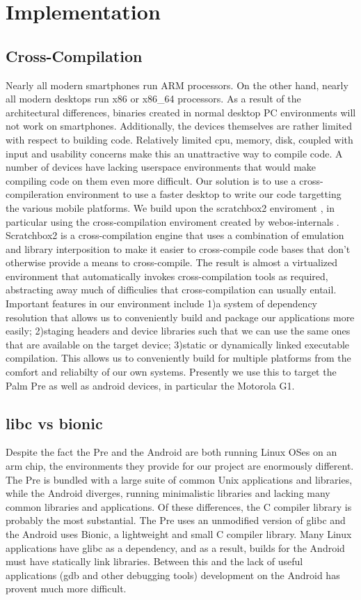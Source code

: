 \section{Implementation}
\label{sec:impl}
\subsection{Cross-Compilation}
Nearly all modern smartphones run ARM processors.  On the other hand, nearly all modern desktops run x86 or x86\_64 processors. As a result of the architectural differences, binaries created in normal desktop PC environments will not work on smartphones. Additionally, the devices themselves are rather limited with respect to building code.  Relatively limited cpu, memory, disk, coupled with input and usability concerns make this an unattractive way to compile code.  A number of devices have lacking userspace environments that would make compiling code on them even more difficult.
Our solution is to use a cross-compileration environment to use a faster desktop to write our code targetting the various mobile platforms.
We build upon the scratchbox2 enviroment \cite{sb2}, in particular using the cross-compilation enviroment created by webos-internals \cite{webosinterals}.\\
Scratchbox2 is a cross-compilation engine that uses a combination of emulation and library interposition to make it easier to cross-compile code bases that don't otherwise provide a means to cross-compile.
The result is almost a virtualized environment that automatically invokes cross-compilation tools as required, abstracting away much of difficulies that cross-compilation can usually entail.
Important features in our environment include 1)a system of dependency resolution that allows us to conveniently build and package our applications more easily; 2)staging headers and device libraries such that we can use the same ones that are available on the target device; 3)static or dynamically linked executable compilation.
This allows us to conveniently build for multiple platforms from the comfort and reliabilty of our own systems.  Presently we use this to target the Palm Pre as well as android devices, in particular the Motorola G1.

\subsection{libc vs bionic}
Despite the fact the Pre and the Android are both running Linux OSes on an arm chip, the environments they provide for our project are enormously different.  The Pre is bundled with a large suite of common Unix applications and libraries, while the Android diverges, running minimalistic libraries and lacking many common libraries and applications.  Of these differences, the C compiler library is probably the most substantial. The Pre uses an unmodified version of glibc and the Android uses Bionic, a lightweight and small C compiler library.  Many Linux applications have glibc as a dependency, and as a result, builds for the Android must have statically link libraries.  Between this and the lack of useful applications (gdb and other debugging tools) development on the Android has provent much more difficult.  

